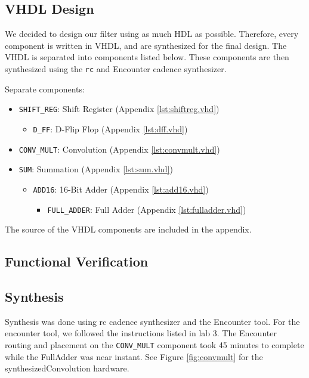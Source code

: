 \subsection{VHDL Design}
We decided to design our filter using as much HDL as possible.  Therefore, every component is written in VHDL, and are synthesized for the final design. The VHDL is separated into components listed below.  These components are then synthesized using the \texttt{rc} and Encounter cadence synthesizer.  

Separate components:
\begin{itemize}
\item \verb=SHIFT_REG=: Shift Register (Appendix \ref{lst:shiftreg.vhd})
	\begin{itemize}
		\item \verb=D_FF=: D-Flip Flop (Appendix \ref{lst:dff.vhd})
	\end{itemize}
\item \verb=CONV_MULT=: Convolution (Appendix \ref{lst:convmult.vhd})
\item \verb=SUM=: Summation (Appendix \ref{lst:sum.vhd})
	\begin{itemize}
		\item \verb=ADD16=: 16-Bit Adder (Appendix \ref{lst:add16.vhd})
		\begin{itemize}
			\item \verb=FULL_ADDER=: Full Adder (Appendix \ref{lst:fulladder.vhd})
		\end{itemize}
	\end{itemize}
\end{itemize}

The source of the VHDL components are included in the appendix.  

\subsection{Functional Verification}



\subsection{Synthesis}
Synthesis was done using rc cadence synthesizer and the Encounter tool.  For the encounter tool, we followed the instructions listed in lab 3.  The Encounter routing and placement on the \verb=CONV_MULT= component took 45 minutes to complete while the FullAdder was near instant.  See Figure \ref{fig:convmult} for the synthesizedConvolution hardware.

